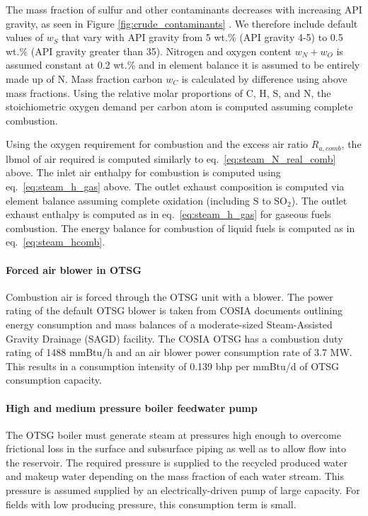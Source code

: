 \documentclass[11pt]{report}
\begin{document}
The mass fraction of sulfur and other contaminants decreases with increasing API gravity, as seen in Figure \ref{fig:crude_contaminants} \cite[Ch. 8, tables 3, 4]{speight1994} \cite[Ch. 7, tables 2, 3, and 19]{speight1994} \cite{swafford2009}. We therefore include default values of $w_S$ that vary with API gravity from 5 wt.\% (API gravity 4-5) to 0.5 wt.\% (API gravity greater than 35). Nitrogen and oxygen content $w_N + w_O$ is assumed constant at 0.2 wt.\% and in element balance it is assumed to be entirely made up of N. Mass fraction carbon $w_C$ is calculated by difference using above mass fractions. Using the relative molar proportions of C, H, S, and N, the stoichiometric oxygen demand per carbon atom is computed assuming complete combustion. 

Using the oxygen requirement for combustion and the excess air ratio $R_{a,comb}$, the lbmol of air required is computed similarly to eq.\ \eqref{eq:steam_N_real_comb} above. The inlet air enthalpy for combustion is computed using eq.\ \eqref{eq:steam_h_gas} above. The outlet exhaust composition is computed via element balance assuming complete oxidation (including S to SO$_2$). The outlet exhaust enthalpy is computed as in eq.\ \eqref{eq:steam_h_gas} for gaseous fuels combustion. The energy balance for combustion of liquid fuels is computed as in eq.\ \eqref{eq:steam_hcomb}.

\paragraph{Forced air blower in OTSG}

Combustion air is forced through the OTSG unit with a blower. The power rating of the default OTSG blower is taken from COSIA documents outlining energy consumption and mass balances of a moderate-sized Steam-Assisted Gravity Drainage (SAGD) facility.  The COSIA OTSG has a combustion duty rating of 1488 mmBtu/h and an air blower power consumption rate of 3.7 MW.  This results in a consumption intensity of 0.139 bhp per mmBtu/d of OTSG consumption capacity.

\paragraph{High and medium pressure boiler feedwater pump}

The OTSG boiler must generate steam at pressures high enough to overcome frictional loss in the surface and subsurface piping as well as to allow flow into the reservoir.  The required pressure is supplied to the recycled produced water and makeup water depending on the mass fraction of each water stream.  This pressure is assumed supplied by an electrically-driven pump of large capacity.  For fields with low producing pressure, this consumption term is small.
\end{document}
